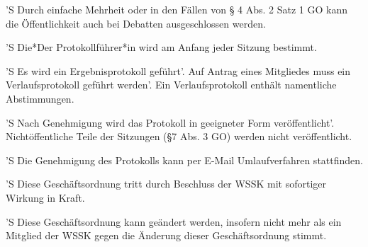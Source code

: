 \documentclass[fontsize=12pt,parskip=half]{scrartcl}
\begin{document}
\begin{contract}
  'S Durch einfache Mehrheit oder in den Fällen von § 4 Abs. 2 Satz 1 GO kann
  die Öffentlichkeit auch bei Debatten ausgeschlossen werden.

  'S Die*Der Protokollführer*in wird am Anfang jeder Sitzung bestimmt.

  'S Es wird ein Ergebnisprotokoll geführt'. Auf Antrag eines Mitgliedes muss
  ein Verlaufsprotokoll geführt werden'. Ein Verlaufsprotokoll enthält
  namentliche Abstimmungen.

  'S Nach Genehmigung wird das Protokoll in geeigneter Form veröffentlicht'.
  Nichtöffentliche Teile der Sitzungen (§7 Abs. 3 GO) werden nicht
  veröffentlicht.

  'S Die Genehmigung des Protokolls kann per E-Mail Umlaufverfahren stattfinden.

  'S  Diese Geschäftsordnung tritt durch Beschluss der WSSK mit sofortiger
  Wirkung in Kraft.

  'S Diese Geschäftsordnung kann geändert werden, insofern nicht mehr als ein
  Mitglied der WSSK gegen die Änderung dieser Geschäftsordnung stimmt.
\end{contract}
\end{document}
